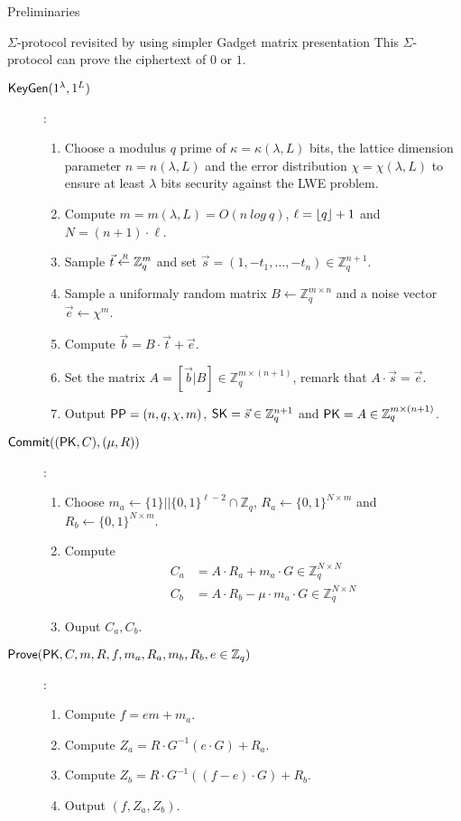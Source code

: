 \begin{section}{Preliminaries}
\begin{subsection}{$\Sigma$-protocol revisited by using simpler Gadget matrix presentation}
    This $\Sigma$-protocol can prove the ciphertext of $0$ or $1$.

    \begin{description}
    \item[${\mathsf{KeyGen}}(1^\lambda, 1^L)$]:
      \begin{enumerate}
      \item Choose a modulus $q$ prime of $\kappa = \kappa(\lambda, L)$ bits, the lattice dimension parameter $n = n(\lambda, L)$ and the error distribution $\chi = \chi(\lambda, L)$ to ensure at least $\lambda$ bits security against the LWE problem.
      \item Compute $m = m(\lambda, L) = O(n~log~q)$, $\ell = \lfloor q\rfloor+1$ and $N = (n+1) \cdot \ell$.
      \item Sample $\vec{t} \stackrel{{\scriptscriptstyle \mkern4mu R}}{\gets} \mathbb{Z}_q^m$ and set $\vec{s} = (1, -t_1, \dots, -t_n) \in \mathbb{Z}_q^{n+1}$.
      \item Sample a uniformaly random matrix $B \gets \mathbb{Z}_q^{m \times n}$ and a noise vector $\vec{e} \gets \chi^m$.
      \item Compute $\vec{b} = B \cdot \vec{t} + \vec{e}$.
      \item Set the matrix $A = [\vec{b}|B] \in \mathbb{Z}_q^{m \times (n+1)}$, remark that $A \cdot \vec{s} = \vec{e}$.
      \item Output ${\mathsf{PP}} = (n, q, \chi, m)$, $\mathsf{SK} = \vec{s} \in \mathbb{Z}_q^{n+1}$ and $\mathsf{PK} = A \in \mathbb{Z}_q^{m \times (n+1)}$.
      \end{enumerate}
    \item[${\mathsf{Commit}}((\mathsf{PK}, C), (\mu, R))$]:
      \begin{enumerate}
      \item Choose $m_a \gets \{1\}||\{0,1\}^{\ell-2} \cap \mathbb{Z}_q$, $R_a \gets \{0,1\}^{N \times m}$ and $R_b \gets \{0,1\}^{N \times m}$.
      \item Compute
        \begin{align*}
          C_a &= A\cdot R_a + m_a \cdot G \in \mathbb{Z}_q^{N \times N}\\
          C_b &= A\cdot R_b - \mu \cdot m_a \cdot G \in \mathbb{Z}_q^{N \times N}          
        \end{align*}
      \item Ouput $C_a, C_b$.
      \end{enumerate}

    \item[${\mathsf{Prove}}(\mathsf{PK}, C, m, R, f, m_a, R_a, m_b, R_b, e \in \mathbb{Z}_q)$]:
      \begin{enumerate}
      \item Compute $f = em +m_a$.
      \item Compute $Z_a = R \cdot G^{-1}(e \cdot G) + R_a$.
      \item Compute $Z_b = R \cdot G^{-1}((f-e) \cdot G) + R_b$.
      \item Output $(f, Z_a, Z_b)$.
      \end{enumerate}
      

\end{description}
\end{subsection}
\end{section}

